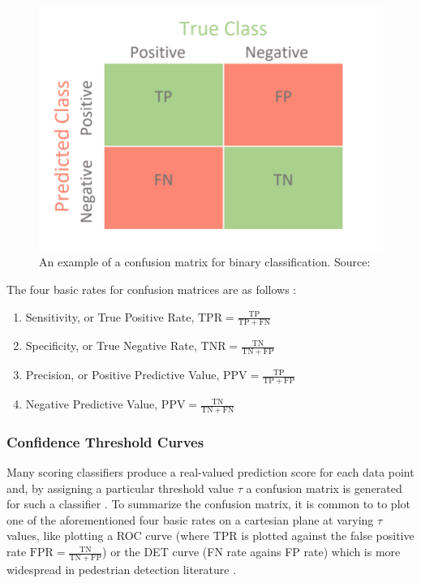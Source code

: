 \begin{figure}
    \centering
    \includegraphics[width=0.5\linewidth]{images/conf_matrix.png}
    \caption{An example of a confusion matrix for binary classification. Source: \cite{conf_matrix}}
    \label{fig:conf_matrix}
\end{figure}

The four basic rates for confusion matrices are as follows \cite{chicco_eval_2023}:
\begin{enumerate}
    \item Sensitivity, or True Positive Rate, $\mathrm{TPR}=\frac{\mathrm{TP}}{\mathrm{TP}+\mathrm{FN}}$

    \item Specificity, or True Negative Rate, $\mathrm{TNR}=\frac{\mathrm{TN}}{\mathrm{TN}+\mathrm{FP}}$
    
    \item Precision, or Positive Predictive Value, $\mathrm{PPV}=\frac{\mathrm{TP}}{\mathrm{TP}+\mathrm{FP}}$
    
    \item Negative Predictive Value, $\mathrm{PPV}=\frac{\mathrm{TN}}{\mathrm{TN}+\mathrm{FN}}$
\end{enumerate} 

\subsubsection{Confidence Threshold Curves}

Many scoring classifiers produce a real-valued prediction score for each data point and, by assigning a particular threshold value $\tau$ a confusion matrix is generated for such a classifier \cite{chicco_jurman_2020_mcc_f1}. To summarize the confusion matrix, it is common to to plot one of the aforementioned four basic rates on a cartesian plane at varying $\tau$ values, like plotting a ROC curve (where TPR is plotted against the false positive rate $\mathrm{FPR}=\frac{\mathrm{TN}}{\mathrm{TN}+\mathrm{FP}}$) or the DET curve (FN rate agains FP rate) which is more widespread in pedestrian detection literature \cite{dalal_2005_histograms} \cite{dollar_2012_pedestrian}. 

